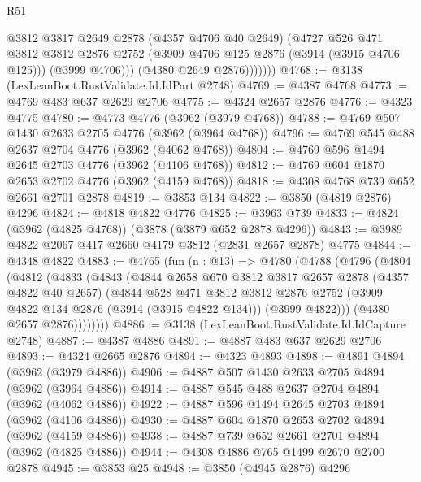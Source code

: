 \begin{lexlean}{R51}
\begin{coremodule}
                  @3812
                  @3817
                  @2649
                  @2878
                  (@4357 @4706 @40 @2649)
                  (@4727
                    @526
                    @471
                    @3812
                    @3812
                    @2876
                    @2752
                    (@3909 @4706 @125 @2876 (@3914 (@3915 @4706 @125)))
                    (@3999 @4706)))
                (@4380 @2649 @2876)))))))
@4768 := @3138 (LexLeanBoot.RustValidate.Id.IdPart @2748)
@4769 := @4387 @4768
@4773 := @4769 @483 @637 @2629 @2706
@4775 := @4324 @2657 @2876
@4776 := @4323 @4775
@4780 := @4773 @4776 (@3962 (@3979 @4768))
@4788 := @4769 @507 @1430 @2633 @2705 @4776 (@3962 (@3964 @4768))
@4796 := @4769 @545 @488 @2637 @2704 @4776 (@3962 (@4062 @4768))
@4804 := @4769 @596 @1494 @2645 @2703 @4776 (@3962 (@4106 @4768))
@4812 := @4769 @604 @1870 @2653 @2702 @4776 (@3962 (@4159 @4768))
@4818 := @4308 @4768 @739 @652 @2661 @2701 @2878
@4819 := @3853 @134
@4822 := @3850 (@4819 @2876) @4296
@4824 := @4818 @4822 @4776
@4825 := @3963 @739
@4833 := @4824 (@3962 (@4825 @4768)) (@3878 (@3879 @652 @2878 @4296))
@4843 := @3989 @4822 @2067 @417 @2660 @4179 @3812 (@2831 @2657 @2878) @4775
@4844 := @4348 @4822
@4883 := @4765
    (fun (n : @13) =>
    @4780
      (@4788
        (@4796
          (@4804
            (@4812
              (@4833
                (@4843
                  (@4844
                    @2658
                    @670
                    @3812
                    @3817
                    @2657
                    @2878
                    (@4357 @4822 @40 @2657)
                    (@4844
                      @528
                      @471
                      @3812
                      @3812
                      @2876
                      @2752
                      (@3909 @4822 @134 @2876 (@3914 (@3915 @4822 @134)))
                      (@3999 @4822)))
                  (@4380 @2657 @2876))))))))
@4886 := @3138 (LexLeanBoot.RustValidate.Id.IdCapture @2748)
@4887 := @4387 @4886
@4891 := @4887 @483 @637 @2629 @2706
@4893 := @4324 @2665 @2876
@4894 := @4323 @4893
@4898 := @4891 @4894 (@3962 (@3979 @4886))
@4906 := @4887 @507 @1430 @2633 @2705 @4894 (@3962 (@3964 @4886))
@4914 := @4887 @545 @488 @2637 @2704 @4894 (@3962 (@4062 @4886))
@4922 := @4887 @596 @1494 @2645 @2703 @4894 (@3962 (@4106 @4886))
@4930 := @4887 @604 @1870 @2653 @2702 @4894 (@3962 (@4159 @4886))
@4938 := @4887 @739 @652 @2661 @2701 @4894 (@3962 (@4825 @4886))
@4944 := @4308 @4886 @765 @1499 @2670 @2700 @2878
@4945 := @3853 @25
@4948 := @3850 (@4945 @2876) @4296

\end{coremodule}
\end{lexlean}
